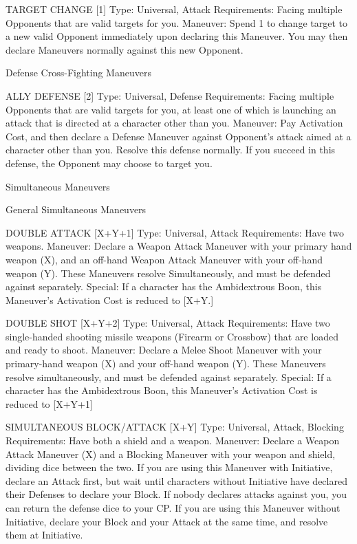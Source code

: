 \documentclass[oneside,11pt,english]{book}
\begin{document}
 

TARGET CHANGE [1] 
Type: Universal, Attack 
Requirements: Facing multiple Opponents that are valid targets for you. 
Maneuver: Spend 1 to change target to a new valid Opponent immediately upon declaring this 
Maneuver. You may then declare Maneuvers normally against this new Opponent. 


 

 

Defense Cross-Fighting Maneuvers 

 

ALLY DEFENSE [2] 
Type: Universal, Defense 
Requirements: Facing multiple Opponents that are valid targets for you, at least one of which is 
launching an attack that is directed at a character other than you. 
Maneuver: Pay Activation Cost, and then declare a Defense Maneuver against Opponent’s attack aimed 
at a character other than you. Resolve this defense normally. If you succeed in this defense, the Opponent 
may choose to target you. 

 

 

Simultaneous Maneuvers 

 

General Simultaneous Maneuvers 

 

DOUBLE ATTACK [X+Y+1] 
Type: Universal, Attack 
Requirements: Have two weapons. 
Maneuver: Declare a Weapon Attack Maneuver with your primary hand weapon (X), and an off-hand 
Weapon Attack Maneuver with your off-hand weapon (Y). These Maneuvers resolve Simultaneously, and 
must be defended against separately. 
Special: If a character has the Ambidextrous Boon, this Maneuver’s Activation Cost is reduced to [X+Y.] 

 

DOUBLE SHOT [X+Y+2] 
Type: Universal, Attack 
Requirements: Have two single-handed shooting missile weapons (Firearm or Crossbow) that are loaded 
and ready to shoot. 
Maneuver: Declare a Melee Shoot Maneuver with your primary-hand weapon (X) and your off-hand 
weapon (Y). These Maneuvers resolve simultaneously, and must be defended against separately. 
Special: If a character has the Ambidextrous Boon, this Maneuver’s Activation Cost is reduced to 
[X+Y+1] 

 

SIMULTANEOUS BLOCK/ATTACK [X+Y] 
Type: Universal, Attack, Blocking 
Requirements: Have both a shield and a weapon. 
Maneuver: Declare a Weapon Attack Maneuver (X) and a Blocking Maneuver with your weapon and 
shield, dividing dice between the two. 
If you are using this Maneuver with Initiative, declare an Attack first, but wait until characters without 
Initiative have declared their Defenses to declare your Block. If nobody declares attacks against you, you 
can return the defense dice to your CP. 
If you are using this Maneuver without Initiative, declare your Block and your Attack at the same time, 
and resolve them at Initiative. 
\end{document}

